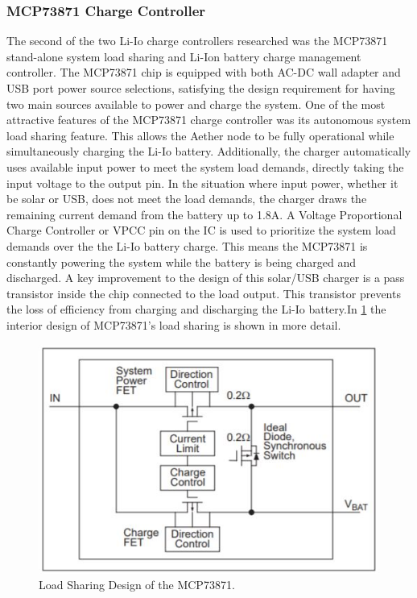 \subsubsection{MCP73871 Charge Controller}
The second of the two Li-Io charge controllers researched was the MCP73871 stand-alone system load sharing and Li-Ion battery charge management controller. The MCP73871 chip is equipped with both AC-DC wall adapter and USB port power source selections, satisfying the design requirement for having two main sources available to power and charge the system. One of the most attractive features of the MCP73871 charge controller was its autonomous system load sharing feature. This allows the Aether node to be fully operational while simultaneously charging the Li-Io battery. Additionally, the charger automatically uses available input power to meet the system load demands, directly taking the input voltage to the output pin. In the situation where input power, whether it be solar or USB, does not meet the load demands, the charger draws the remaining current demand from the battery up to 1.8A. A Voltage Proportional Charge Controller or VPCC pin on the IC is used to prioritize the system load demands over the the Li-Io battery charge. This means the MCP73871 is constantly powering the system while the battery is being charged and discharged. A key improvement to the design of this solar/USB charger is a pass transistor inside the chip connected to the load output. This transistor prevents the loss of efficiency from charging and discharging the Li-Io battery.In \ref{fig:load-sharing} the interior design of MCP73871's load sharing is shown in more detail.    

\begin{figure}
    \centering
    \includegraphics[scale=1.0]{figures/load-sharing.JPG}
    \caption{Load Sharing Design of the MCP73871.}
    \label{fig:load-sharing} 
\end{figure}

